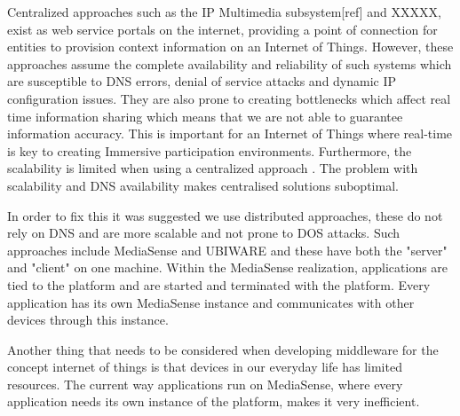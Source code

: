 Centralized approaches such as the IP Multimedia subsystem[ref] and XXXXX, exist as web service portals on the internet, providing a point of connection for entities to provision context information on an Internet of Things. However, these approaches assume the complete availability and reliability of such systems which are susceptible to DNS errors, denial of service attacks and dynamic IP configuration issues. They are also prone to creating bottlenecks which affect real time information sharing which means that we are not able to guarantee information accuracy. This is important for an Internet of Things where real-time is key to creating Immersive participation environments. Furthermore, the scalability is limited when using a centralized approach \cite{Kanter539187}. The problem with scalability and DNS availability makes centralised solutions suboptimal.

In order to fix this it was suggested we use distributed approaches, these do not rely on DNS and are more scalable and not prone to DOS attacks. Such approaches include MediaSense \cite{Kanter539187} and UBIWARE \cite{osterle2010memorandum} and these have both the "server" and "client" on one machine. Within the MediaSense realization, applications are tied to the platform and are started and terminated with the platform. Every application has its own MediaSense instance and communicates with other devices through this instance.

Another thing that needs to be considered when developing middleware for the concept internet of things is that devices in our everyday life has limited resources. The current way applications run on MediaSense, where every application needs its own instance of the platform, makes it very inefficient.